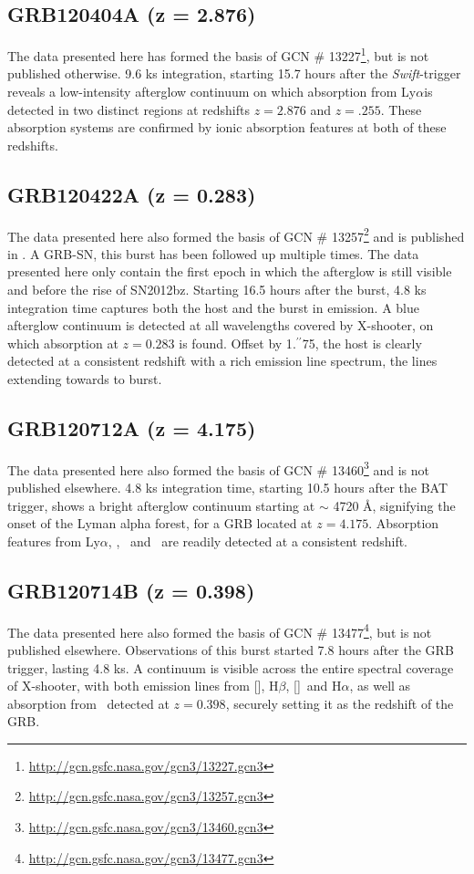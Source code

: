 \documentclass[iop, twocolappendix, numberedappendix, tighten, appendixfloats]{emulateapj}
\newcommand{\farc}{\hbox{$.\!\!^{\prime\prime}$}}
\newcommand{\lya}{Ly$\alpha$}
\newcommand{\hb}{H$\beta$}
\newcommand{\ha}{H$\alpha$}
\newcommand{\oii}{[\ion{O}{2}]}
\newcommand{\oiii}{[\ion{O}{3}]}
\newcommand{\feii}{\ion{Fe}{2}}
\newcommand{\mgii}{\ion{Mg}{2}}
\newcommand{\SIii}{\ion{Si}{2}}
\begin{document}
	\subsection{GRB120404A (z = 2.876)}
	The data presented here has formed the basis of GCN \#
	13227\footnote{\url{http://gcn.gsfc.nasa.gov/gcn3/13227.gcn3}}, but is not
	published otherwise. 9.6 ks integration, starting 15.7 hours after the
	\textit{Swift}-trigger reveals a low-intensity afterglow continuum on which
	absorption from \lya is detected in two distinct regions at redshifts $z=2.876$
	and $z=.255$. These absorption systems are confirmed by ionic absorption
	features at both of these redshifts.

	
	\subsection{GRB120422A (z = 0.283)}
	The data presented here also formed the basis of GCN \#
	13257\footnote{\url{http://gcn.gsfc.nasa.gov/gcn3/13257.gcn3}} and is published
	in \citet{Schulze2014}. A GRB-SN, this burst has been followed up multiple
	times. The data presented here only contain the first epoch in which the
	afterglow is still visible and before the rise of SN2012bz. Starting 16.5 hours
	after the burst, 4.8 ks integration time captures both the host and the burst
	in emission. A blue afterglow continuum is detected at all wavelengths covered
	by X-shooter, on which \mgii absorption at $z = 0.283$ is found. Offset by
	1\farc75, the host is clearly detected at a consistent redshift with a rich
	emission line spectrum, the lines extending towards to burst.

	\subsection{GRB120712A (z = 4.175)}
	The data presented here also formed the basis of GCN \#
	13460\footnote{\url{http://gcn.gsfc.nasa.gov/gcn3/13460.gcn3}} and is not
	published elsewhere. 4.8 ks integration time, starting 10.5 hours after the BAT
	trigger, shows a bright afterglow continuum starting at $\sim$ 4720 \AA,
	signifying the onset of the Lyman alpha forest, for a GRB located at $z =
	4.175$. Absorption features from \lya, \feii, \mgii~and \SIii~are readily
	detected at a consistent redshift.

	\subsection{GRB120714B (z = 0.398)}
	The data presented here also formed the basis of GCN \#
	13477\footnote{\url{http://gcn.gsfc.nasa.gov/gcn3/13477.gcn3}}, but is not
	published elsewhere. Observations of this burst started 7.8 hours after the GRB
	trigger, lasting 4.8 ks. A continuum is visible across the entire spectral
	coverage of X-shooter, with both emission lines from  \oii, \hb, \oiii~and \ha,
	as well as absorption from \mgii~detected at $z = 0.398$, securely setting it
	as the redshift of the GRB.
	
\end{document}
